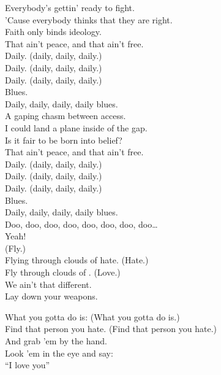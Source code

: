 


Everybody's gettin' ready to fight. \\
'Cause everybody thinks that they are right. \\
Faith only binds ideology. \\
That ain't peace, and that ain't free. \\

Daily. (daily, daily, daily.) \\
Daily. (daily, daily, daily.) \\
Daily. (daily, daily, daily.) \\
Blues. \\
Daily, daily, daily, daily blues. \\

A gaping chasm between access. \\
I could land a plane inside of the gap. \\
Is it fair to be born into belief? \\
That ain't peace, and that ain't free. \\

Daily. (daily, daily, daily.) \\
Daily. (daily, daily, daily.) \\
Daily. (daily, daily, daily.) \\
Blues. \\
Daily, daily, daily, daily blues. \\

Doo, doo, doo, doo, doo, doo, doo, doo… \\
Yeah! \\

(Fly.) \\
Flying through clouds of hate. (Hate.) \\
Fly through clouds of . (Love.) \\
We ain't that different. \\
Lay down your weapons. \\


What you gotta do is: (What you gotta do is.) \\
Find that person you hate. (Find that person you hate.) \\
And grab 'em by the hand. \\
Look 'em in the eye and say: \\
``I love you'' \\

